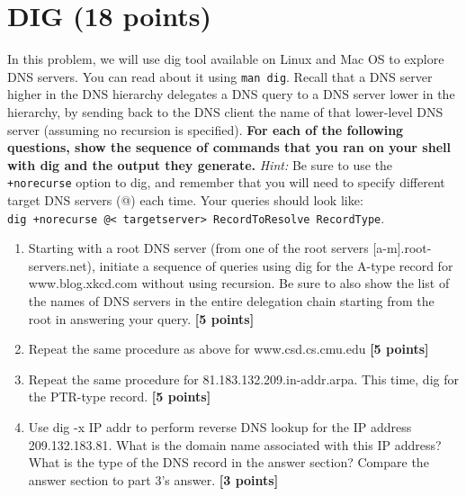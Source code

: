 \documentclass{article}
\begin{document}
\section{DIG (18 points)}
In this problem, we will use dig tool available on Linux and Mac OS to explore DNS servers. You can
read about it using \verb|man dig|. Recall that a DNS server higher in the DNS hierarchy delegates a DNS
query to a DNS server lower in the hierarchy, by sending back to the DNS client the name of that
lower-level DNS server (assuming no recursion is specified). \textbf{For each of the following questions, show the sequence of commands that you ran on your shell with dig and the output they generate.} \textit{Hint:} Be sure to use the \verb|+norecurse| option
to dig, and remember that you will need to specify different target DNS servers (@) each time. Your
queries should look like:\\
\verb|dig +norecurse @< targetserver> RecordToResolve RecordType|.

\begin{enumerate}
\item Starting with a root DNS server (from one of the root servers [a-m].root-servers.net),  initiate a
sequence of queries using dig for the A-type record for www.blog.xkcd.com without using recursion.
Be sure to also show the list of the names of DNS servers in the entire delegation chain starting from
the root in answering your query. \textbf{[5 points]}

\item  Repeat the same procedure as above for www.csd.cs.cmu.edu \textbf{[5 points]}

\item Repeat the same procedure for 81.183.132.209.in-addr.arpa. This time, dig for the PTR-type
record. \textbf{[5 points]}

\item Use dig -x IP addr to perform reverse DNS lookup for the IP address 209.132.183.81. What
is the domain name associated with this IP address? What is the type of the DNS record in the
answer section? Compare the answer section to part 3’s answer. \textbf{[3 points]}

\end{enumerate}
\end{document}
